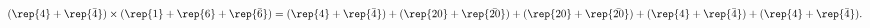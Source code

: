 \begin{equation}
   (\rep{4}+\rep{\bar{4}}) \times (\rep{1}+\rep{6}+\rep{\bar{6}})
       = (\rep{4}+\rep{\bar{4}}) + (\rep{20}+\rep{\bar{20}})
          + (\rep{20}+\rep{\bar{20}}) + (\rep{4}+\rep{\bar{4}})
          + (\rep{4}+\rep{\bar{4}}) .
\end{equation}

